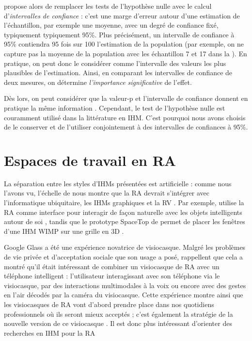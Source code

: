\cite{Dragicevic2016} propose alors de remplacer les tests de l'hypothèse nulle avec le calcul d'\emph{intervalles de confiance} : c'est une marge d'erreur autour d'une estimation de l'échantillon, par exemple une moyenne, avec un degré de confiance fixé, typiquement typiquement 95\%. Plus précisément, un intervalle de confiance à 95\% contiendra 95 fois sur 100 l'estimation de la population (par exemple, on ne capture pas la moyenne de la population avec les échantillon 7 et 17 dans la ). En pratique, on peut donc le considérer comme l'intervalle des valeurs les plus plausibles de l'estimation. Ainsi, en comparant les intervalles de confiance de deux mesures, on détermine \emph{l'importance significative} de l'effet.

Dès lors, on peut considérer que la valeur-p et l'intervalle de confiance donnent en pratique la même information \cite{Dragicevic2016}. Cependant, le test de l'hypothèse nulle est couramment utilisé dans la littérature en IHM. C'est pourquoi nous avons choisis de le conserver et de l'utiliser conjointement à des intervalles de confiances à 95\%.


\section{Espaces de travail en RA}
\label{sec:litterature_ar_worspaces}

La séparation entre les styles d'IHMs présentées \cite{Rekimoto1995}  est artificielle : comme nous l'avons vu, l'échelle de \cite{Milgram1994} nous montre que la RA devrait s'intégrer avec l'informatique ubiquitaire, les IHMs graphiques et la RV \cite{Billinghurst2005}. Par exemple, \cite{Heun2013} utilise la RA comme interface pour interagir de façon naturelle avec les objets intelligents autour de soi , tandis que le prototype SpaceTop de \cite{Lee2013} permet de placer les fenêtres d'une IHM WIMP sur une grille en 3D .


Google Glass a été une expérience novatrice de visiocasque. Malgré les problèmes de vie privée et d'acceptation sociale que son usage a posé, \cite{Koelle2015} rappellent que cela a montré qu'il était intéressant de combiner un visiocasque de RA avec un téléphone intelligent : l'utilisateur interagissant avec son téléphone via le visiocasque, par des interactions multimodales à la voix ou encore avec des gestes en l'air décodés par la caméra du visiocasque. Cette expérience montre ainsi que les visiocasques de RA vont d'abord prendre place dans nos quotidiens professionnels où ils seront mieux acceptés ; c'est également la stratégie de la nouvelle version de ce visiocasque \cite{Levy2017}. Il est donc plus intéressant d'orienter des recherches en IHM pour la RA


